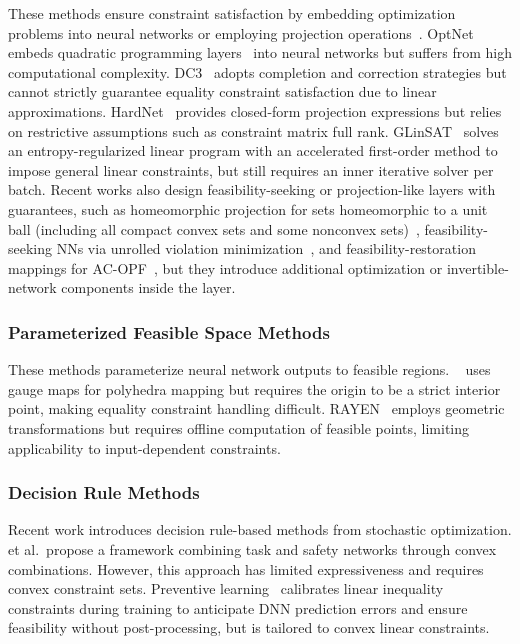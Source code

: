 \documentclass[letterpaper]{article} %
\begin{document}
These methods ensure constraint satisfaction by embedding optimization problems into neural networks or employing projection operations~\cite{chenEnforcingPolicyFeasibility2021}. OptNet~\cite{amosOptNetDifferentiableOptimization2017} embeds quadratic programming layers~\cite{butlerEfficientDifferentiableQuadratic2023} into neural networks but suffers from high computational complexity. DC3~\cite{dontiDC3LearningMethod2021} adopts completion and correction strategies but cannot strictly guarantee equality constraint satisfaction due to linear approximations. HardNet~\cite{minHardNetHardConstrainedNeural2025} provides closed-form projection expressions but relies on restrictive assumptions such as constraint matrix full rank. GLinSAT~\cite{zengGLinSATGeneralLinear2024} solves an entropy-regularized linear program with an accelerated first-order method to impose general linear constraints, but still requires an inner iterative solver per batch. Recent works also design feasibility-seeking or projection-like layers with guarantees, such as homeomorphic projection for sets homeomorphic to a unit ball (including all compact convex sets and some nonconvex sets)~\cite{liang2023low}, feasibility-seeking NNs via unrolled violation minimization~\cite{nguyen2025fsnet}, and feasibility-restoration mappings for AC-OPF~\cite{hanFRMNetFeasibilityRestoration2024a}, but they introduce additional optimization or invertible-network components inside the layer.

\subsubsection{Parameterized Feasible Space Methods} 

These methods parameterize neural network outputs to feasible regions. \citeauthor{zhangEfficientLearningBasedSolver2024}~ uses gauge maps for polyhedra mapping but requires the origin to be a strict interior point, making equality constraint handling difficult. RAYEN~\cite{tordesillasRAYENImpositionHard2023} employs geometric transformations but requires offline computation of feasible points, limiting applicability to input-dependent constraints. 

\subsubsection{Decision Rule Methods} 

Recent work introduces decision rule-based methods from stochastic optimization. \cite{constante-floresEnforcingHardLinear2025} et al.\ propose a framework combining task and safety networks through convex combinations. However, this approach has limited expressiveness and requires convex constraint sets. Preventive learning~\cite{zhao2023ensuring} calibrates linear inequality constraints during training to anticipate DNN prediction errors and ensure feasibility without post-processing, but is tailored to convex linear constraints. 
\end{document}
